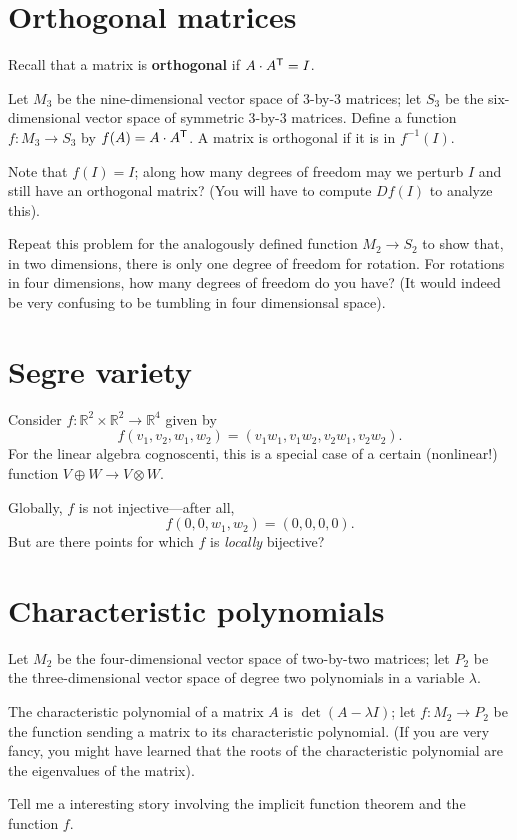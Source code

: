 \documentclass[12pt]{article}
\newcommand{\R}{\mathbb{R}}
\newcommand{\transpose}{{\mbox{\scriptsize\sf T}}}
\begin{document}
\section{Orthogonal matrices}

Recall that a matrix is \textbf{orthogonal} if $A \cdot A^\transpose =
I$.

Let $M_3$ be the nine-dimensional vector space of 3-by-3 matrices; let
$S_3$ be the six-dimensional vector space of symmetric 3-by-3
matrices.  Define a function $f : M_3 \to S_3$ by $f(A) = A \cdot
A^\transpose$.  A matrix is orthogonal if it is in $f^{-1}(I)$.

Note that $f(I) = I$; along how many degrees of freedom may we perturb
$I$ and still have an orthogonal matrix?  (You will have to compute
$Df(I)$ to analyze this).

Repeat this problem for the analogously defined function $M_2 \to S_2$
to show that, in two dimensions, there is only one degree of freedom
for rotation.  For rotations in four dimensions, how many degrees of
freedom do you have?  (It would indeed be very confusing to be
tumbling in four dimensionsal space).

\section{Segre variety}

Consider $f : \R^2 \times \R^2 \to \R^4$ given by
$$
f(v_1,v_2,w_1,w_2) = (v_1 w_1, v_1 w_2, v_2 w_1, v_2 w_2).
$$
For the linear algebra cognoscenti, this is a special case of a
certain (nonlinear!) function $V \oplus W \to V \otimes W$.

Globally, $f$ is not injective---after all,
$$
f(0,0,w_1,w_2) = (0,0,0,0).
$$
But are there points for which $f$ is \textit{locally} bijective?

\section{Characteristic polynomials}

Let $M_2$ be the four-dimensional vector space of two-by-two matrices;
let $P_2$ be the three-dimensional vector space of degree two
polynomials in a variable $\lambda$.

The characteristic polynomial of a matrix $A$ is $\det (A - \lambda
I)$; let $f : M_2 \to P_2$ be the function sending a matrix to its
characteristic polynomial.  (If you are very fancy, you might have
learned that the roots of the characteristic polynomial are the
eigenvalues of the matrix).

Tell me a interesting story involving the implicit function theorem and
the function $f$.
\end{document}
